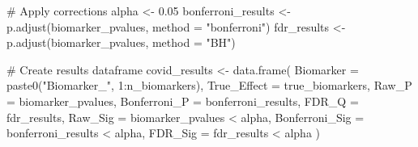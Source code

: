 \documentclass[
  11pt,
  letterpaper,
  oneside]{book}
\newenvironment{Shaded}{\begin{snugshade}}{\end{snugshade}}
\newcommand{\AttributeTok}[1]{\textcolor[rgb]{0.40,0.45,0.13}{#1}}
\newcommand{\CommentTok}[1]{\textcolor[rgb]{0.37,0.37,0.37}{#1}}
\newcommand{\DecValTok}[1]{\textcolor[rgb]{0.68,0.00,0.00}{#1}}
\newcommand{\FloatTok}[1]{\textcolor[rgb]{0.68,0.00,0.00}{#1}}
\newcommand{\FunctionTok}[1]{\textcolor[rgb]{0.28,0.35,0.67}{#1}}
\newcommand{\NormalTok}[1]{\textcolor[rgb]{0.00,0.23,0.31}{#1}}
\newcommand{\OtherTok}[1]{\textcolor[rgb]{0.00,0.23,0.31}{#1}}
\newcommand{\SpecialCharTok}[1]{\textcolor[rgb]{0.37,0.37,0.37}{#1}}
\newcommand{\StringTok}[1]{\textcolor[rgb]{0.13,0.47,0.30}{#1}}
\begin{document}
\begin{Shaded}
\begin{Highlighting}[]
\CommentTok{\# Apply corrections}
\NormalTok{alpha }\OtherTok{\textless{}{-}} \FloatTok{0.05}
\NormalTok{bonferroni\_results }\OtherTok{\textless{}{-}} \FunctionTok{p.adjust}\NormalTok{(biomarker\_pvalues, }\AttributeTok{method =} \StringTok{"bonferroni"}\NormalTok{)}
\NormalTok{fdr\_results }\OtherTok{\textless{}{-}} \FunctionTok{p.adjust}\NormalTok{(biomarker\_pvalues, }\AttributeTok{method =} \StringTok{"BH"}\NormalTok{)}

\CommentTok{\# Create results dataframe}
\NormalTok{covid\_results }\OtherTok{\textless{}{-}} \FunctionTok{data.frame}\NormalTok{(}
  \AttributeTok{Biomarker =} \FunctionTok{paste0}\NormalTok{(}\StringTok{"Biomarker\_"}\NormalTok{, }\DecValTok{1}\SpecialCharTok{:}\NormalTok{n\_biomarkers),}
  \AttributeTok{True\_Effect =}\NormalTok{ true\_biomarkers,}
  \AttributeTok{Raw\_P =}\NormalTok{ biomarker\_pvalues,}
  \AttributeTok{Bonferroni\_P =}\NormalTok{ bonferroni\_results,}
  \AttributeTok{FDR\_Q =}\NormalTok{ fdr\_results,}
  \AttributeTok{Raw\_Sig =}\NormalTok{ biomarker\_pvalues }\SpecialCharTok{\textless{}}\NormalTok{ alpha,}
  \AttributeTok{Bonferroni\_Sig =}\NormalTok{ bonferroni\_results }\SpecialCharTok{\textless{}}\NormalTok{ alpha,}
  \AttributeTok{FDR\_Sig =}\NormalTok{ fdr\_results }\SpecialCharTok{\textless{}}\NormalTok{ alpha}
\NormalTok{)}


\end{Highlighting}
\end{Shaded}
\end{document}
